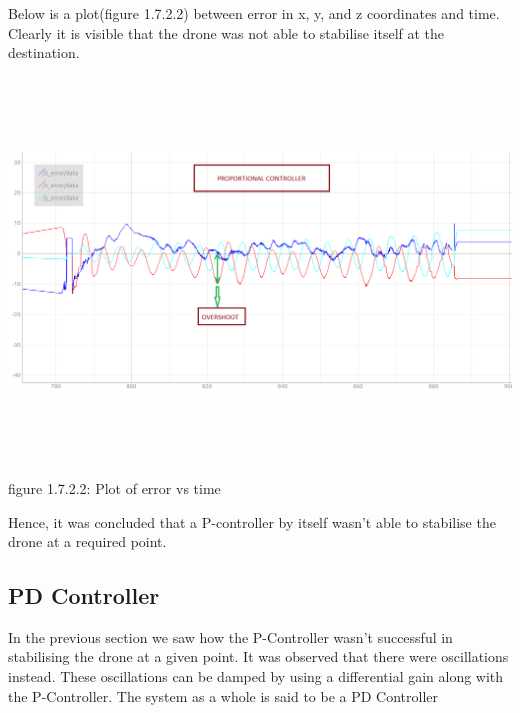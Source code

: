 \documentclass[a4paper,12pt,oneside]{book}
\begin{document}
Below is a plot(figure 1.7.2.2) between error in x, y, and z coordinates and time. Clearly it is visible that the drone was not able to stabilise itself at the destination.\\ \\
\includegraphics[width = 15cm , height= 10cm]{only-P(all).png}
\begin{center}
    figure 1.7.2.2: Plot of error vs time
\end{center}
Hence, it was concluded that a P-controller by itself wasn't able to stabilise the drone at a required point. \\

\subsection{PD Controller}
In the previous section we saw how the P-Controller wasn't successful in stabilising the drone at a given point. It was observed that there were oscillations instead. These oscillations can be damped by using a differential gain  along with the P-Controller. The system as a whole is said to be a PD Controller 
\end{document}
